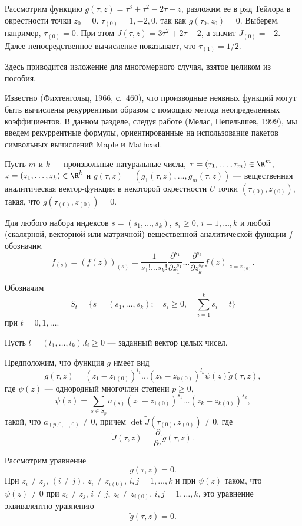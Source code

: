 \begin{ex}
    Рассмотрим функцию $g(\tau, z) = \tau^3 + \tau^2 - 2\tau + z$, разложим ее в ряд Тейлора в окрестности точки $z_0 = 0$.
    $\tau_{(0)} = 1, -2, 0$, так как $g(\tau_0, z_0) = 0$.
    Выберем, например, $\tau_{(0)} = 0$.
    При этом $J(\tau, z) = 3 \tau^2 + 2\tau -2$, а значит $J_{(0)} = -2$.
    Далее непосредственное вычисление показывает, что $\tau_{(1)} = 1/2$.
\end{ex}

Здесь приводится изложение для многомерного случая, взятое целиком из пособия.

Известно (Фихтенгольц, 1966, с.~460), что производные неявных
функций могут быть вычислены рекуррентным образом с помощью метода
неопределенных коэффициентов. В данном разделе, следуя работе
(Мелас, Пепелышев, 1999), мы введем рекуррентные формулы,
ориентированные на использование пакетов символьных вычислений Maple
и Mathcad.

Пусть $m$ и $k$ --- произвольные натуральные числа,
$\tau=(\tau_1,\ldots,\tau_m) \in {\R}^m$, $z=(z_1,\ldots,z_k)\in
{\R}^k$ и $g(\tau,z)=(g_1(\tau,z), \ldots,g_m(\tau,z))$ ---
вещественная аналитическая вектор-функция в некоторой окрестности
$U$ точки $(\tau_{(0)},z_{(0)})$, такая, что
$g(\tau_{(0)},z_{(0)})=0$.

Для любого набора индексов $s=(s_1,\ldots,s_k)$, $s_i\geq 0$,
$i=1,\ldots,k$ и любой (скалярной, векторной или матричной)
вещественной аналитической функции $f$ обозначим
$$
f_{(s)}=\left(f(z)\right)_{(s)}=\frac{1}{s_1!\ldots s_k!}
\frac{\partial^{s_1}}{\partial z_1^{s_1}}\ldots
\frac{\partial^{s_k}}{\partial z_k^{s_k}} f(z)|_{z=z_{(0)}}.
$$

Обозначим
$$
S_t=\{s=(s_1,\ldots,s_k);\quad s_i\geq 0,\quad \sum^k_{i=1} s_i=t\}
$$
при $t=0,1,\ldots$.

Пусть $l=(l_1,\ldots,l_k)$,$l_i\geq 0$ --- заданный вектор целых
чисел.

Предположим, что функция $g$ имеет вид
$$
g(\tau,z)=(z_1-z_{1(0)})^{l_1}\ldots (z_k-z_{k(0)})^{l_k}
\psi(z)\tilde g(\tau,z),
$$
где $\psi(z)$ --- однородный многочлен степени $p\geq 0$,
$$
\psi(z)=\sum_{s\in S_p}a_{(s)}(z_1-z_{1(0)})^{s_1}\ldots
(z_k-z_{k(0)})^{s_k},
$$
такой, что $a_{(p,0,\ldots,0)}\ne 0$, причем $\det \tilde
J(\tau_{(0)},z_{(0)})\ne 0$, где
$$
\tilde J(\tau,z)=\frac{\partial}{\partial\tau}\tilde g(\tau,z).
$$

Рассмотрим уравнение
$$
g(\tau,z)=0.
$$
При $z_i\ne z_j$, $(i\ne j)$, $z_i\ne z_{i(0)}$, $i,j=1,\ldots,k$ и
при $\psi(z)$ таком, что $\psi(z)\ne 0$ при $z_i\ne z_j$, $i\ne j$,
$z_i\ne z_{i(0)}$, $i,j=1,\ldots,k$, это уравнение эквивалентно
уравнению
$$
\tilde g(\tau,z)=0.
$$

